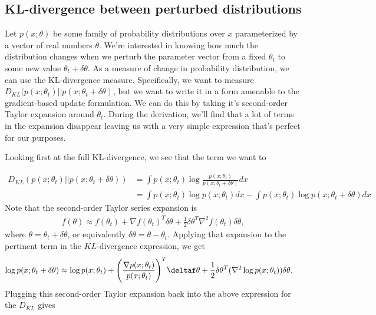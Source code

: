 \subsection{KL-divergence between perturbed distributions}
Let $p(x; \theta)$ be some family of probability distributions over $x$ parameterized by a vector of real numbers $\theta$. We're interested in knowing how much the distribution changes when we perturb the parameter vector from a fixed $\theta_t$ to some new value $\theta_t+\delta \theta$. As a measure of change in probability distribution, we can use the KL-divergence measure. Specifically, we want to measure $D_{KL}(p(x;\theta_t)|| p(x;\theta_t+\delta \theta)$, but we want to write it in a form amenable to the gradient-based update formulation. We can do this by taking it's second-order Taylor expansion around $\theta_t$. During the derivation, we'll find that a lot of terms in the expansion disappear leaving us with a very simple expression that's perfect for our purposes. 

Looking first at the full KL-divergence, we see that the term we want to 

\begin{align*}
	D_{KL}(p(x;\theta_t)||p(x;\theta_t+\delta \theta)) &= \int p(x;\theta_t)\log \frac{p(x;\theta_t)}{p(x;\theta_t+\delta \theta)} dx\\
	&= \int p(x;\theta_t)\log p(x;\theta_t) dx - \int p(x;\theta_t)\log p(x;\theta_t+\delta \theta) dx
\end{align*}
Note that the second-order Taylor series expansion is
\begin{align*}
	f(\theta) \approx f(\theta_t) + \nabla f(\theta_t)^T\delta\theta + \frac{1}{2} \delta\theta^T\nabla^2f(\theta_t)\delta\theta,
\end{align*}
where $\theta=\theta_t+\delta\theta$, or equivalently $\delta\theta = \theta-\theta_t$. Applying that expansion to the pertinent term in the $KL$-divergence expression, we get
\begin{align*}
	\log p(x;\theta_t+\delta \theta) &\approx \log p(x;\theta_t) + \Bigg(\frac{\nabla p(x;\theta_t)}{p(x;\theta_t)}\Bigg)^T \deltaf\theta + \frac{1}{2}\delta\theta^T (\nabla^2 \log p(x;\theta_t))\delta\theta.
\end{align*}
Plugging this second-order Taylor expansion back into the above expression for the $D_{KL}$ gives

